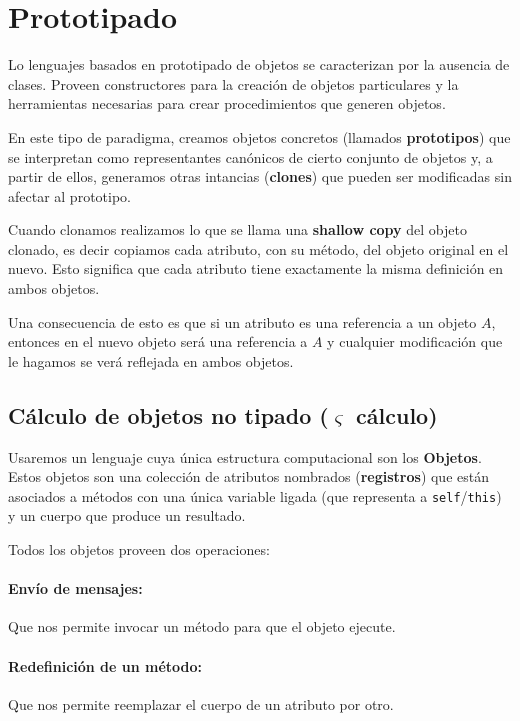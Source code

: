 
\section{Prototipado}
Lo lenguajes basados en prototipado de objetos se caracterizan por la ausencia de clases. Proveen constructores para la creación de objetos particulares y la herramientas necesarias para crear procedimientos que generen objetos.

En este tipo de paradigma, creamos objetos concretos (llamados \textbf{prototipos}) que se interpretan como representantes canónicos de cierto conjunto de objetos y, a partir de ellos, generamos otras intancias (\textbf{clones}) que pueden ser modificadas sin afectar al prototipo.

Cuando clonamos realizamos lo que se llama una \textbf{shallow copy} del objeto clonado, es decir copiamos cada atributo, con su método, del objeto original en el nuevo. Esto significa que cada atributo tiene exactamente la misma definición en ambos objetos.

Una consecuencia de esto es que si un atributo es una referencia a un objeto $A$, entonces en el nuevo objeto será una referencia a $A$ y cualquier modificación que le hagamos se verá reflejada en ambos objetos.

\subsection{Cálculo de objetos no tipado \texorpdfstring{($\varsigma$}{(Sigma} cálculo)}
Usaremos un lenguaje cuya única estructura computacional son los \textbf{Objetos}. Estos objetos son una colección de atributos nombrados (\textbf{registros}) que están asociados a métodos con una única variable ligada (que representa a \texttt{self}/\texttt{this}) y un cuerpo que produce un resultado.

Todos los objetos proveen dos operaciones:

\paragraph{Envío de mensajes:} Que nos permite invocar un método para que el objeto ejecute.

\paragraph{Redefinición de un método:} Que nos permite reemplazar el cuerpo de un atributo por otro.

